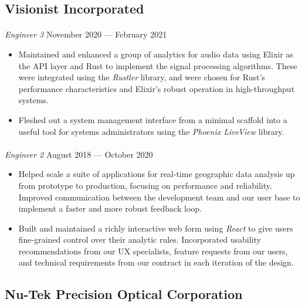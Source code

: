 \documentclass[10pt]{article}
\begin{document}
\subsection*{Visionist Incorporated}
\paragraph{}
\textit{Engineer 3} \hfill November 2020 --- February 2021

\begin{itemize}
  \item Maintained and enhanced a group of analytics for audio data using
    Elixir as the API layer and Rust to implement the signal processing
    algorithms. These were integrated using the \textit{Rustler} library, and
    were chosen for Rust's performance characteristics and Elixir's robust
    operation in high-throughput systems.
  \item Fleshed out a system management interface from a minimal scaffold into
    a useful tool for systems administrators using the \textit{Phoenix
    LiveView} library.
\end{itemize}

\paragraph{}
\textit{Engineer 2} \hfill August 2018 --- October 2020

\begin{itemize}
  \item Helped scale a suite of applications for real-time geographic data
    analysis up from prototype to production, focusing on performance and
    reliability. Improved communication between the development team and our
    user base to implement a faster and more robust feedback loop.
  \item Built and maintained a richly interactive web form using \textit{React}
    to give users fine-grained control over their analytic rules. Incorporated
    usability recommendations from our UX specialists, feature requests from
    our users, and technical requirements from our contract in each iteration
    of the design.
\end{itemize}

\subsection*{Nu-Tek Precision Optical Corporation}
\end{document}
